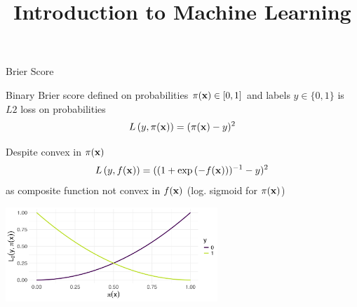 \documentclass[11pt,compress,t,notes=noshow, xcolor=table]{beamer}
\title{Introduction to Machine Learning}
\begin{document}
    


\begin{vbframe}{Brier Score}

\begin{itemizeM}
    \item Binary Brier score defined on probabilities $\pi(\mathbf{x}) \in [0, 1]$ and labels $y \in \{0, 1\}$ is $L2$ loss on probabilities $$L\left(y, \pi(\mathbf{x})\right) = (\pi(\mathbf{x}) - y)^2$$
    \item Despite convex in $\pi(\mathbf{x})$ $$L\left(y, f(\mathbf{x})\right)=((1+\exp{(-f(\mathbf{x}))})^{-1}-y)^2$$ as composite function not convex in $f(\mathbf{x})$ (log. sigmoid for $\pi(\mathbf{x})$)
\end{itemizeM}

\vspace{-0.2cm}
\begin{center}
\includegraphics[width = 0.6\textwidth]{figure/brier.png}
\end{center}


\end{vbframe}
\end{document}
